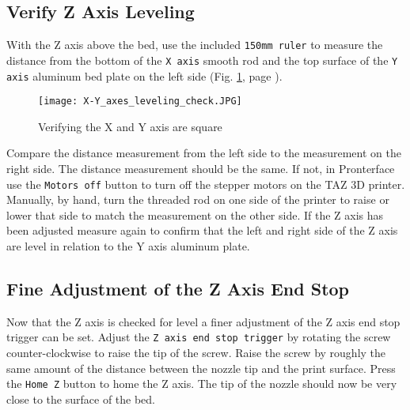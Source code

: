\subsection{Verify Z Axis Leveling}
With the Z axis above the bed, use the included \texttt{150mm ruler} to measure the distance from the bottom of the \texttt{X axis} smooth rod and the top surface of the \texttt{Y axis} aluminum bed plate on the left side (Fig. \ref{fig:X-Y_axes_leveling_check}, page \pageref{fig:X-Y_axes_leveling_check}).
\begin{figure}[H]
\centering
\texttt{[image: X-Y\_axes\_leveling\_check.JPG]}
\caption{Verifying the X and Y axis are square}
\label{fig:X-Y_axes_leveling_check}
\end{figure} 
Compare the distance measurement from the left side to the measurement on the right side. The distance measurement should be the same. If not, in Pronterface use the \texttt{Motors off} button to turn off the stepper motors on the TAZ 3D printer. Manually, by hand, turn the threaded rod on one side of the printer to raise or lower that side to match the measurement on the other side. If the Z axis has been adjusted measure again to confirm that the left and right side of the Z axis are level in relation to the Y axis aluminum plate.


\subsection{Fine Adjustment of the Z Axis End Stop}
\begin{comment}
\begin{figure}[H]
\centering
\texttt{[image: Z\_end\_stop\_trigger.JPG]}
\caption{Z end stop trigger}
\label{fig:Z_end_stop_trigger}
\end{figure}
\end{comment}
Now that the Z axis is checked for level a finer adjustment of the Z axis end stop trigger can be set.
Adjust the \texttt{Z axis end stop trigger} by rotating the screw counter-clockwise to raise the tip of the screw. Raise the screw by roughly the same amount of the distance between the nozzle tip and the print surface. Press the \texttt{Home Z} button to home the Z axis. The tip of the nozzle should now be very close to the surface of the bed.

